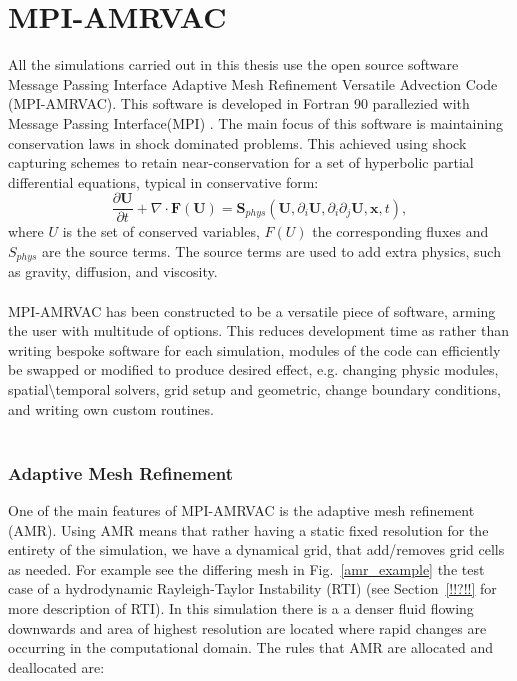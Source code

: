 \documentclass[12pt]{ociamthesis}
\newcommand{\np}{\\ \\}
\begin{document}
\section{MPI-AMRVAC}
All the simulations carried out in this thesis use the open source software Message Passing Interface Adaptive Mesh Refinement Versatile Advection Code (MPI-AMRVAC). This software is developed in Fortran 90 parallezied with Message Passing Interface(MPI) \citep{toth1996ApLC34245T,Keppens_2012,Porth_2014,Xia_2017}. The main focus of this software is maintaining conservation laws in shock dominated problems. This achieved using shock capturing schemes to retain near-conservation for a set of hyperbolic partial differential equations, typical in conservative form: 
\begin{equation}\label{AMRVAC_stlye}
\frac{\partial \boldsymbol{U}}{\partial t} + \nabla \cdot \boldsymbol{F}(\boldsymbol{U}) = \boldsymbol{S}_{phys} (\boldsymbol{U}, \partial_{i} \boldsymbol{U}, \partial_i \partial_j \boldsymbol{U},\boldsymbol{x},t) ,
\end{equation}
where $U$ is the set of conserved variables, $F(U)$ the corresponding fluxes and $S_{phys}$ are the source terms. The source terms are used to add extra physics, such as gravity, diffusion, and viscosity. \np
%
MPI-AMRVAC has been constructed to be a versatile piece of software, arming the user with multitude of options. This reduces development time as rather than writing bespoke software for each simulation, modules of the code can efficiently be swapped or modified to produce desired effect, e.g. changing physic modules, spatial\textbackslash temporal solvers, grid setup and geometric, change boundary conditions, and writing own custom routines. \np
% 
\subsubsection{Adaptive Mesh Refinement}
One of the main features of MPI-AMRVAC is the adaptive mesh refinement (AMR). Using AMR means that rather having a static fixed resolution for the entirety of the simulation, we have a dynamical grid, that add/removes grid cells as needed. For example see the differing mesh in Fig.~\ref{amr_example} the test case of a hydrodynamic Rayleigh-Taylor Instability (RTI) (see Section~\ref{!!?!!} for more description of RTI). In this simulation there is a a denser fluid flowing downwards and area of highest resolution are located where rapid changes are occurring in the computational domain. The rules that AMR are allocated and deallocated are:     
\end{document}
